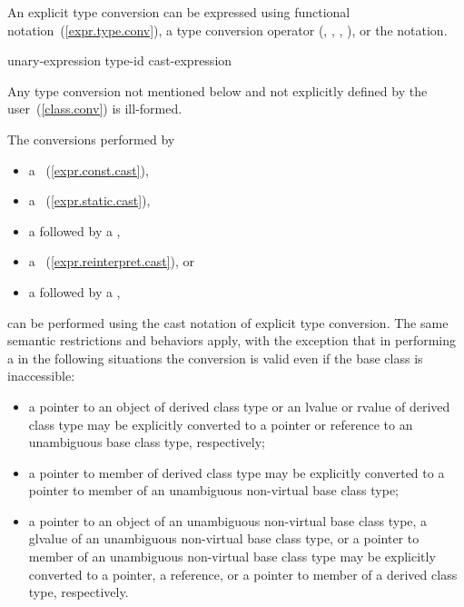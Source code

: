 \pnum
An explicit type conversion can be expressed using functional
notation~(\ref{expr.type.conv}), a type conversion operator
(, , ,
), or the  notation.

\begin{bnf}
\br
    unary-expression\br
    \terminal{(} type-id \terminal{)} cast-expression
\end{bnf}

\pnum
Any type conversion not mentioned below and not explicitly defined by
the user~(\ref{class.conv}) is ill-formed.

\pnum
The conversions performed by

\begin{itemize}
%
%
%
\item a ~(\ref{expr.const.cast}),
\item a ~(\ref{expr.static.cast}),
\item a  followed by a ,
\item a ~(\ref{expr.reinterpret.cast}), or
\item a  followed by a ,
\end{itemize}

can be performed using the cast notation of explicit type conversion.
The same semantic restrictions and behaviors apply, with the exception
that in performing a  in the following situations the
conversion is valid even if the base class is inaccessible:

\begin{itemize}
\item a pointer to an object of derived class type or an lvalue or
rvalue of derived class type may be explicitly converted to a pointer or
reference to an unambiguous base class type, respectively;

\item a pointer to member of derived class type may be explicitly
converted to a pointer to member of an unambiguous non-virtual base
class type;

\item a pointer to an object of an unambiguous non-virtual base class
type, a glvalue of an unambiguous non-virtual base class type,
or a pointer to member of an unambiguous non-virtual base class type may
be explicitly converted to a pointer, a reference, or a pointer to
member of a derived class type, respectively.
\end{itemize}

